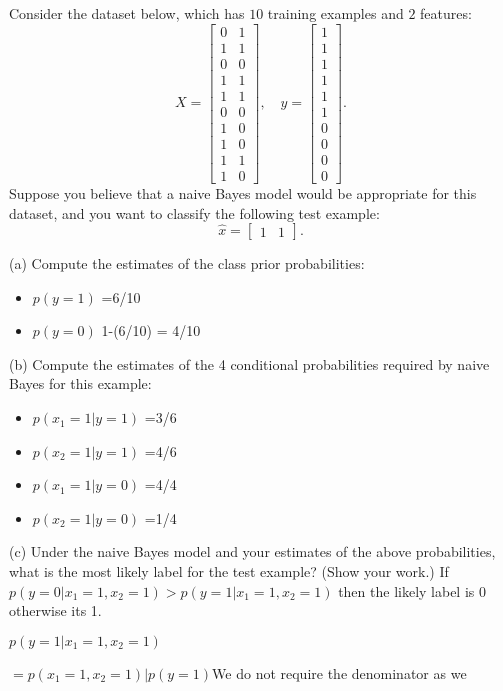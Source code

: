 \documentclass{article}
\def\blu#1{{\color{blu}#1}}
\def\gre#1{{\color{gre}#1}}
\def\red#1{{\color{red}#1}}
\def\items#1{\begin{itemize}#1\end{itemize}}
\begin{document}
Consider the dataset below, which has $10$ training examples and $2$ features:
\[
X = \begin{bmatrix}0 & 1\\1 & 1\\ 0 & 0\\ 1 & 1\\ 1 & 1\\ 0 & 0\\  1 & 0\\  1 & 0\\  1 & 1\\  1 &0\end{bmatrix}, \quad y = \begin{bmatrix}1\\1\\1\\1\\1\\1\\0\\0\\0\\0\end{bmatrix}.
\]
Suppose you believe that a naive Bayes model would be appropriate for this dataset, and you want to classify the following test example:
\[
\hat{x} = \begin{bmatrix}1 & 1\end{bmatrix}.
\]

\blu{(a) Compute the estimates of the class prior probabilities:}
\items{
\item$ p(y = 1)$ =\gre {6/10}
\item $p(y = 0)$ \gre {1-(6/10) = 4/10}
}

\blu{(b) Compute the estimates of the 4 conditional probabilities required by naive Bayes for this example:}
\items{
\item $p(x_1 = 1 | y = 1)$ =\gre {3/6}
\item $p(x_2 = 1 | y = 1)$ =\gre {4/6}
\item $p(x_1 = 1 | y = 0)$ =\gre {4/4}
\item $p(x_2 = 1 | y = 0)$ =\gre {1/4}
}

\blu{(c) Under the naive Bayes model and your estimates of the above probabilities, what is the most likely label for the test example? (Show your work.)}
\gre {If $p(y = 0|x_1 = 1, x_2 = 1) > p(y = 1|x_1 = 1, x_2 = 1)$ then the likely label is 0 otherwise its 1.}

\gre{$p(y = 1|x_1 = 1, x_2 = 1)$}

\gre{$=p(x_1 = 1, x_2 = 1)|p(y=1)$}\red{We do not require the denominator as we  }
\end{document}
